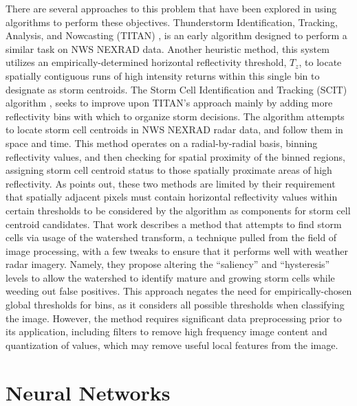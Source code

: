 There are several approaches to this problem that have been explored in using algorithms to perform these objectives. 
Thunderstorm Identification, Tracking, Analysis, and Nowcasting (TITAN) \cite{dixon1993titan}, is an early algorithm designed to perform a similar task on NWS NEXRAD data. 
Another heuristic method, this system utilizes an empirically-determined horizontal reflectivity threshold, $T_z$, to locate spatially contiguous runs of high intensity returns within this single bin to designate as storm centroids. 
The Storm Cell Identification and Tracking (SCIT) algorithm \cite{johnson1998storm}, seeks to improve upon TITAN’s approach mainly by adding more reflectivity bins with which to organize storm decisions. 
The algorithm attempts to locate storm cell centroids in NWS NEXRAD radar data, and follow them in space and time. 
This method operates on a radial-by-radial basis, binning reflectivity values, and then checking for spatial proximity of the binned regions, assigning storm cell centroid status to those spatially proximate areas of high reflectivity. 
As \cite{lakshmanan2009efficient} points out, these two methods are limited by their requirement that spatially adjacent pixels must contain horizontal reflectivity values within certain thresholds to be considered by the algorithm as components for storm cell centroid candidates. 
That work describes a method that attempts to find storm cells via usage of the watershed transform, a technique pulled from the field of image processing, with a few tweaks to ensure that it performs well with weather radar imagery. 
Namely, they propose altering the “saliency” and “hysteresis” levels to allow the watershed to identify mature and growing storm cells while weeding out false positives. 
This approach negates the need for empirically-chosen global thresholds for bins, as it considers all possible thresholds when classifying the image. 
However, the method requires significant data preprocessing prior to its application, including filters to remove high frequency image content and quantization of values, which may remove useful local features from the image.

\section{Neural Networks}
\label{sec:background_neuralnetworks}
%

